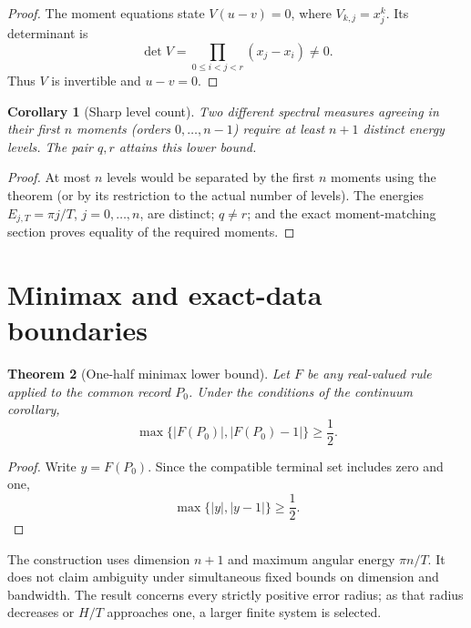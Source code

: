 \documentclass[12pt]{article}
\newtheorem{theorem}{Theorem}[section]
\newtheorem{corollary}[theorem]{Corollary}
\begin{document}
\begin{proof}
The moment equations state \(V(u-v)=0\), where
\(V_{k,j}=x_j^k\). Its determinant is
\[
\det V=\prod_{0\leq i<j<r}(x_j-x_i)\neq0.
\]
Thus \(V\) is invertible and \(u-v=0\).
\end{proof}

\begin{corollary}[Sharp level count]
Two different spectral measures agreeing in their first \(n\) moments
(orders \(0,\ldots,n-1\)) require at least \(n+1\) distinct energy levels.
The pair \(q,r\) attains this lower bound.
\end{corollary}

\begin{proof}
At most \(n\) levels would be separated by the first \(n\) moments using the
theorem (or by its restriction to the actual number of levels). The
energies \(E_{j,T}=\pi j/T\), \(j=0,\ldots,n\), are distinct; \(q\neq r\);
and the exact moment-matching section proves equality of the required
moments.
\end{proof}

\section{Minimax and exact-data boundaries}

\begin{theorem}[One-half minimax lower bound]
Let \(F\) be any real-valued rule applied to the common record \(P_0\).
Under the conditions of the continuum corollary,
\[
\max\{|F(P_0)|,|F(P_0)-1|\}\geq\frac12.
\]
\end{theorem}

\begin{proof}
Write \(y=F(P_0)\). Since the compatible terminal set includes zero and
one,
\[
\max\{|y|,|y-1|\}\geq\frac12.
\]
\end{proof}

The construction uses dimension \(n+1\) and maximum angular energy
\(\pi n/T\). It does not claim ambiguity under simultaneous fixed bounds on
dimension and bandwidth. The result concerns every strictly positive error
radius; as that radius decreases or \(H/T\) approaches one, a larger finite
system is selected.
\end{document}
